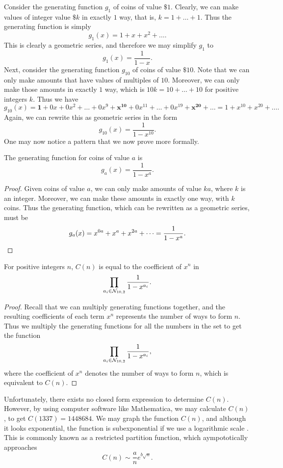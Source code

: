 Consider the generating function $g_1$ of coins of value $\$ 1$. Clearly, we can make values of integer value $\$ k$ in exactly $1$ way, that is, $k = 1 + \dots + 1$. Thus the generating function is simply \[
  g_{1}(x) = 1 + x + x^2 + \dots
.\] This is clearly a geometric series, and therefore we may simplify $g_1$ to \[
  g_1(x) = \frac{1}{1-x}
.\] Next, consider the generating function $g_{10}$ of coins of value $\$ 10$. Note that we can only make amounts that have values of multiples of  $10$. Moreover, we can only make those amounts in exactly $1$ way, which is $10k = 10 + \dots + 10$ for positive integers $k$. Thus we have \[
g_{10}(x) = \bm{1} + 0x + 0x^2 + \dots + 0x^{9} + \bm{x^{10}} + 0x^{11} + \dots + 0x^{19} + \bm{x^{20}} + \dots = 1 + x^{10} + x^{20} + \dots
.\] Again, we can rewrite this as geometric series in the form \[
  g_{10}(x) = \frac{1}{1-x^{10}}
.\] One may now notice a pattern that we now prove more formally.
\begin{theorem}
  The generating function for coins of value $a$ is \[
    g_a(x) = \frac{1}{1-x^a}
  .\] 
\end{theorem}
\begin{proof}
  Given coins of value $a$, we can only make amounts of value $ka$, where $k$ is an integer. Moreover, we can make these amounts in exactly one way, with $k$ coins. Thus the generating function, which can be rewritten as a geometric series, must be \[
    g_a(x) = x^{0a} + x^{a} + x^{2a} + \dots = \frac{1}{1-x^{a}} \qedhere
  .\] 
\end{proof}
\begin{theorem}
  For positive integers $n$, $C(n)$ is equal to the coefficient of $x^{n}$ in \[
    \prod_{a_i \in \mathcal{N}_{10, 2}} \frac{1}{1-x^{a_i}}
  .\] 
\end{theorem}
\begin{proof}
  Recall that we can multiply generating functions together, and the resulting coefficients of each term $x^{n}$ represents the number of ways to form $n$. Thus we multiply the generating functions for all the numbers in the set \NTen{} to get the function \[
    \prod_{a_i\in \mathcal{N}_{10, 2}} \frac{1}{1-x^{a_i}}
  ,\] where the coefficient of $x^n$ denotes the number of ways to form $n$, which is equivalent to $C(n)$.
\end{proof}
Unfortunately, there exists no closed form expression to determine $C(n)$. %
However, by using computer software like Mathematica, we may calculate $C(n)$, to get $C(1337) = 1448684$. We may graph the function $C(n)$, and although it looks exponential, the function is subexponential if we use a logarithmic scale \cite{spivak}. This is commonly known as a restricted partition function, which aympototically approaches \cite{hardyramanujan} \[
  C(n) \sim \frac{a}{n}e^{b\sqrt{n}}
.\] %


